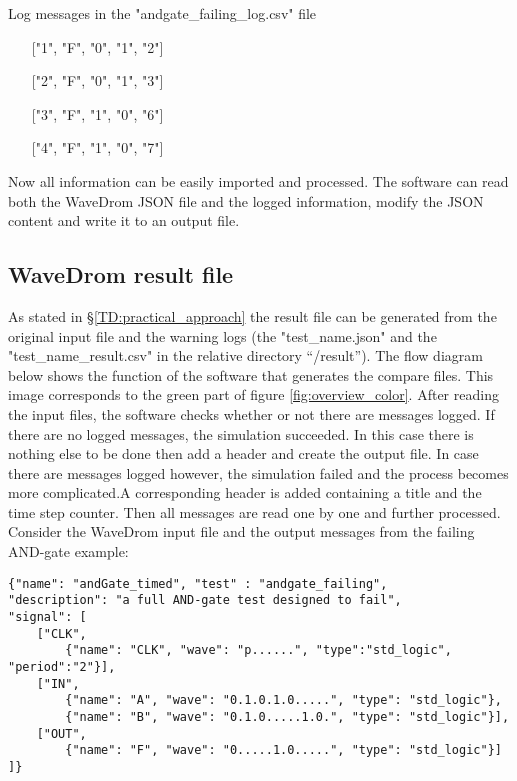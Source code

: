 \begin{customenv}
	\caption{Log messages in the "andgate\_failing\_log.csv" file}
	\begin{itemize}
		\centering
		\item [] ["1", "F", "0", "1", "2"]
		\item [] ["2", "F", "0", "1", "3"]
		\item [] ["3", "F", "1", "0", "6"]
		\item [] ["4", "F", "1", "0", "7"]
	\end{itemize}
\end{customenv}\nline
Now all information can be easily imported and processed. The software can read both the WaveDrom JSON file and the logged information, modify the JSON content and write it to an output file.
\newpage\noindent
\subsection{WaveDrom result file}
As stated in §\ref{TD:practical_approach} the result file can be generated from the original input file and the warning logs (the "test\_name.json" and the "test\_name\_result.csv" in the relative directory “/result”). The flow diagram below shows the function of the software that generates the compare files. This image corresponds to the green part of figure \ref{fig:overview_color}. \newpage\noindent
After reading the input files, the software checks whether or not there are messages logged. If there are no logged messages, the simulation succeeded. In this case there is nothing else to be done then add a header and create the output file. In case there are messages logged however, the simulation failed and the process becomes more complicated.A corresponding header is added containing a title and the time step counter. Then all messages are read one by one and further processed.
\npar
Consider the WaveDrom input file and the output messages from the failing AND-gate example:
\begin{lstlisting}[style=json, caption={Source file for a failing AND-gate example}, label={json:andgate_failing}]
{"name": "andGate_timed", "test" : "andgate_failing", 
"description": "a full AND-gate test designed to fail", 
"signal": [
	["CLK",
		{"name": "CLK", "wave": "p......", "type":"std_logic", "period":"2"}],
	["IN",
		{"name": "A", "wave": "0.1.0.1.0.....", "type": "std_logic"},
		{"name": "B", "wave": "0.1.0.....1.0.", "type": "std_logic"}],
	["OUT",
		{"name": "F", "wave": "0.....1.0.....", "type": "std_logic"}]
]}
\end{lstlisting}\noindent
